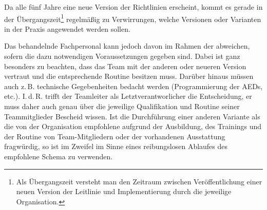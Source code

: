 {%
Da alle fünf Jahre eine neue Version der Richtlinien
erscheint, kommt es gerade in der
Übergangszeit\footnote{Als Übergangszeit versteht man den
Zeitraum zwischen Veröffentlichung einer neuen Version der
Leitlinie und Implementierung durch die jeweilige
Organisation.} regelmäßig zu Verwirrungen, welche Versionen
oder Varianten in der Praxis angewendet werden sollen.

 Das
behandelnde Fachpersonal kann jedoch davon im Rahmen der
 abweichen, sofern die dazu
notwendigen Voraussetzungen gegeben sind. Dabei ist ganz
besonders zu beachten, dass das  Team mit der
anderen oder neueren Version vertraut und die entsprechende
Routine besitzen muss. Darüber hinaus müssen auch
z.\,B. technische Gegebenheiten bedacht werden
(Programmierung der AEDs, etc.). I.\,d.\,R. trifft der
Teamleiter als Letztverantworlicher die
Entscheidung, er muss daher auch genau über die jeweilige
Qualifikation und Routine seiner Teammitglieder Bescheid
wissen. Ist die Durchführung einer anderen Variante als die
von der Organisation empfohlene aufgrund der Ausbildung, des
Trainings und der Routine von Team-Mitgliedern oder der
vorhandenen Ausstattung fragwürdig, so ist im Zweifel im Sinne eines
reibungslosen Ablaufes des empfohlene Schema zu verwenden.


}
%




